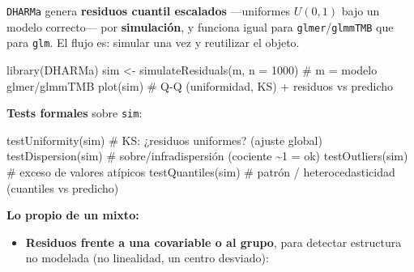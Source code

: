 \documentclass[
  letterpaper,
  DIV=11,
  numbers=noendperiod]{scrartcl}
\newenvironment{Shaded}{\begin{snugshade}}{\end{snugshade}}
\newcommand{\AttributeTok}[1]{\textcolor[rgb]{0.40,0.45,0.13}{#1}}
\newcommand{\CommentTok}[1]{\textcolor[rgb]{0.37,0.37,0.37}{#1}}
\newcommand{\DecValTok}[1]{\textcolor[rgb]{0.68,0.00,0.00}{#1}}
\newcommand{\FunctionTok}[1]{\textcolor[rgb]{0.28,0.35,0.67}{#1}}
\newcommand{\NormalTok}[1]{\textcolor[rgb]{0.00,0.23,0.31}{#1}}
\newcommand{\OtherTok}[1]{\textcolor[rgb]{0.00,0.23,0.31}{#1}}
\providecommand{\tightlist}{%
  \setlength{\itemsep}{0pt}\setlength{\parskip}{0pt}}\usepackage{longtable,booktabs,array}
\begin{document}
\begin{tcolorbox}[enhanced jigsaw, coltitle=black, rightrule=.15mm, arc=.35mm, leftrule=.75mm, colback=white, colbacktitle=quarto-callout-tip-color!10!white, left=2mm, breakable, toptitle=1mm, toprule=.15mm, bottomtitle=1mm, titlerule=0mm, title=\textcolor{quarto-callout-tip-color}{\faLightbulb}\hspace{0.5em}{🔧 En R. Residuos simulados (DHARMa) en modelos mixtos}, bottomrule=.15mm, opacityback=0, opacitybacktitle=0.6, colframe=quarto-callout-tip-color-frame]

\texttt{DHARMa} genera \textbf{residuos cuantil escalados} ---uniformes
\(U(0,1)\) bajo un modelo correcto--- por \textbf{simulación}, y
funciona igual para \texttt{glmer}/\texttt{glmmTMB} que para
\texttt{glm}. El flujo es: simular una vez y reutilizar el objeto.

\begin{Shaded}
\begin{Highlighting}[]
\FunctionTok{library}\NormalTok{(DHARMa)}
\NormalTok{sim }\OtherTok{\textless{}{-}} \FunctionTok{simulateResiduals}\NormalTok{(m, }\AttributeTok{n =} \DecValTok{1000}\NormalTok{)   }\CommentTok{\# m = modelo glmer/glmmTMB}
\FunctionTok{plot}\NormalTok{(sim)                                }\CommentTok{\# Q{-}Q (uniformidad, KS) + residuos vs predicho}
\end{Highlighting}
\end{Shaded}

\textbf{Tests formales} sobre \texttt{sim}:

\begin{Shaded}
\begin{Highlighting}[]
\FunctionTok{testUniformity}\NormalTok{(sim)     }\CommentTok{\# KS: ¿residuos uniformes? (ajuste global)}
\FunctionTok{testDispersion}\NormalTok{(sim)     }\CommentTok{\# sobre/infradispersión (cociente \textasciitilde{}1 = ok)}
\FunctionTok{testOutliers}\NormalTok{(sim)       }\CommentTok{\# exceso de valores atípicos}
\FunctionTok{testQuantiles}\NormalTok{(sim)      }\CommentTok{\# patrón / heterocedasticidad (cuantiles vs predicho)}
\end{Highlighting}
\end{Shaded}

\textbf{Lo propio de un mixto:}

\begin{itemize}
\tightlist
\item
  \textbf{Residuos frente a una covariable o al grupo}, para detectar
  estructura no modelada (no linealidad, un centro desviado):
\end{itemize}


\end{tcolorbox}
\end{document}
